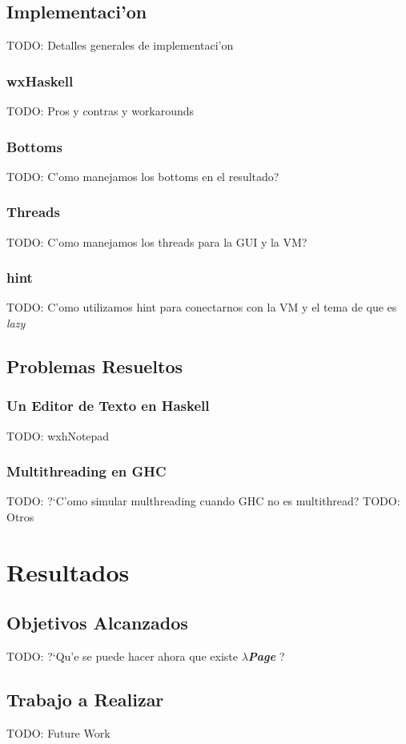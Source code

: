 \documentclass[a4paper]{article}
\newcommand{\hpage}{\textbf{\textsl{$\lambda$Page}} }
\begin{document}
\subsection{Implementaci'on} TODO: Detalles generales de implementaci'on
\subsubsection{wxHaskell}TODO: Pros y contras y workarounds
\subsubsection{Bottoms}TODO: C'omo manejamos los bottoms en el resultado?
\subsubsection{Threads}TODO: C'omo manejamos los threads para la GUI y la VM?
\subsubsection{hint}TODO: C'omo utilizamos hint para conectarnos con la VM y el tema de que es \textsl{lazy}
\subsection{Problemas Resueltos}
\subsubsection{Un Editor de Texto en Haskell}TODO: wxhNotepad
\subsubsection{Multithreading en GHC}TODO: ?`C'omo simular multhreading cuando GHC no es multithread?
TODO: Otros

\section{Resultados}
\subsection{Objetivos Alcanzados}TODO: ?`Qu'e se puede hacer ahora que existe \hpage?
\subsection{Trabajo a Realizar} TODO: Future Work
\end{document}
